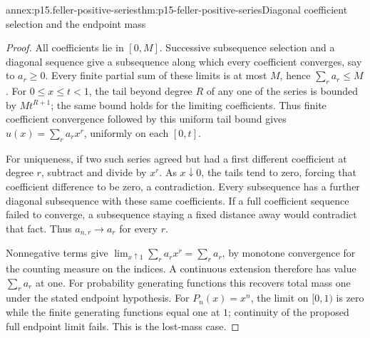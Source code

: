\begin{annexitem}{annex:p15.feller-positive-series}{thm:p15-feller-positive-series}{Diagonal coefficient selection and the endpoint mass}
\begin{proof}
All coefficients lie in \([0,M]\).
Successive subsequence selection and a diagonal sequence give a
subsequence along which every coefficient converges, say to \(a_r\geq0\).
Every finite partial sum of these limits is at most \(M\), hence
\(\sum_r a_r\leq M\).
For \(0\leq x\leq t<1\), the tail beyond degree \(R\) of any
one of the series is bounded by \(Mt^{R+1}\); the same bound
holds for the limiting coefficients.
Thus finite coefficient convergence followed by this uniform tail
bound gives
\(u(x)=\sum_r a_rx^r\), uniformly on each \([0,t]\).

For uniqueness, if two such series agreed but had a first different
coefficient at degree \(r\), subtract and divide by \(x^r\).
As \(x\downarrow0\), the tails tend to zero, forcing that coefficient
difference to be zero, a contradiction.
Every subsequence has a further diagonal subsequence with these same
coefficients. If a full coefficient sequence failed to converge, a
subsequence staying a fixed distance away would contradict that fact.
Thus \(a_{n,r}\to a_r\) for every \(r\).

Nonnegative terms give
\(\lim_{x\uparrow1}\sum_r a_rx^r=\sum_r a_r\), by monotone convergence
for the counting measure on the indices.
A continuous extension therefore has value \(\sum_r a_r\) at one.
For probability generating functions this recovers total mass one
under the stated endpoint hypothesis.
For \(P_n(x)=x^n\), the limit on \([0,1)\) is zero while the
finite generating functions equal one at \(1\); continuity of
the proposed full endpoint limit fails. This is the lost-mass case.
\end{proof}
\end{annexitem}

